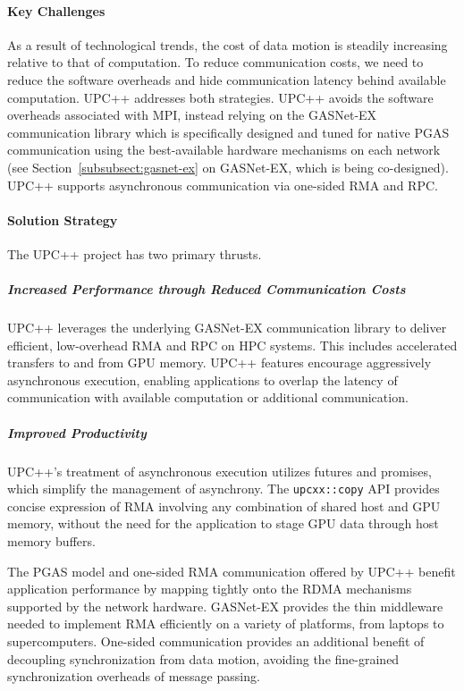 \paragraph{Key Challenges}

As a result of technological trends, the cost of data motion is steadily increasing relative to that of computation.  To reduce communication costs, we need to 
reduce the software overheads and hide communication latency behind available computation. UPC++ addresses both strategies.
UPC++ avoids the software overheads associated with MPI, 
instead relying on the GASNet-EX~\cite{gasnet-site,gasnet-lcpc18}
communication library which is specifically designed and tuned
for native PGAS communication using the best-available hardware
mechanisms on each network
(see Section~\ref{subsubsect:gasnet-ex} on GASNet-EX, which is being co-designed).
UPC++ supports asynchronous communication via one-sided RMA and RPC.

\paragraph{Solution Strategy}

The UPC++ project has two primary thrusts.


\subparagraph{Increased Performance through Reduced Communication Costs} 
UPC++ leverages the underlying GASNet-EX communication library to deliver efficient, low-overhead RMA and RPC on HPC systems.
This includes accelerated transfers to and from GPU memory.
UPC++ features encourage aggressively asynchronous execution,
enabling applications to overlap the latency of communication with
available computation or additional communication.

\subparagraph{Improved Productivity} UPC++'s treatment of asynchronous
execution utilizes futures and promises, which simplify the management of
asynchrony.
The \texttt{upcxx::copy} API provides concise expression of RMA involving any
combination of shared host and GPU memory, without the need for the application
to stage GPU data through host memory buffers.

The PGAS model and one-sided RMA communication offered by UPC++
benefit application performance by mapping tightly onto the RDMA mechanisms
supported by the network hardware. GASNet-EX provides the
thin middleware needed to implement RMA efficiently on a variety of platforms,
from laptops to supercomputers.
One-sided communication provides an additional benefit of
decoupling synchronization from data motion,
avoiding the fine-grained synchronization overheads of message passing.

